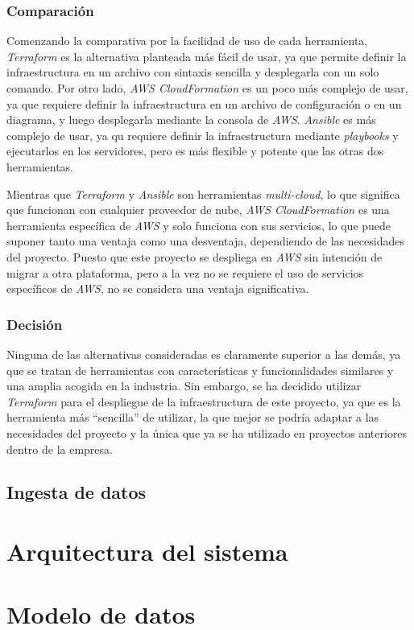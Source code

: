 \subsubsection{Comparación}
Comenzando la comparativa por la facilidad de uso de cada herramienta, \textit{Terraform}
es la alternativa planteada más fácil de usar, ya que permite definir la infraestructura
en un archivo con sintaxis sencilla y desplegarla con un solo comando. Por otro lado,
\textit{AWS CloudFormation} es un poco más complejo de usar, ya que requiere definir
la infraestructura en un archivo de configuración o en un diagrama, y luego desplegarla
mediante la consola de \textit{AWS}. \textit{Ansible} es más complejo de usar, ya qu
requiere definir la infraestructura mediante \textit{playbooks} y ejecutarlos en los
servidores, pero es más flexible y potente que las otras dos herramientas.

Mientras que \textit{Terraform} y \textit{Ansible} son herramientas \textit{multi-cloud},
lo que significa que funcionan con cualquier proveedor de nube, \textit{AWS CloudFormation}
es una herramienta específica de \textit{AWS} y solo funciona con sus servicios, lo que
puede suponer tanto una ventaja como una desventaja, dependiendo de las necesidades del
proyecto. Puesto que este proyecto se despliega en \textit{AWS} sin intención de migrar a
otra plataforma, pero a la vez no se requiere el uso de servicios específicos de \textit{AWS},
no se considera una ventaja significativa.

\subsubsection{Decisión}
Ninguna de las alternativas consideradas es claramente superior a las demás, ya que
se tratan de herramientas con características y funcionalidades similares y una
amplia acogida en la industria. Sin embargo, se ha decidido utilizar \textit{Terraform}
para el despliegue de la infraestructura de este proyecto, ya que es la herramienta
más ``sencilla'' de utilizar, la que mejor se podría adaptar a las necesidades del
proyecto y la única que ya se ha utilizado en proyectos anteriores dentro de la empresa.

\subsection{Ingesta de datos}\label{subsec:ingesta}

\newpage{}
\section{Arquitectura del sistema}\label{sec:arquitectura}

\newpage{}
\section{Modelo de datos}\label{sec:modelo}
